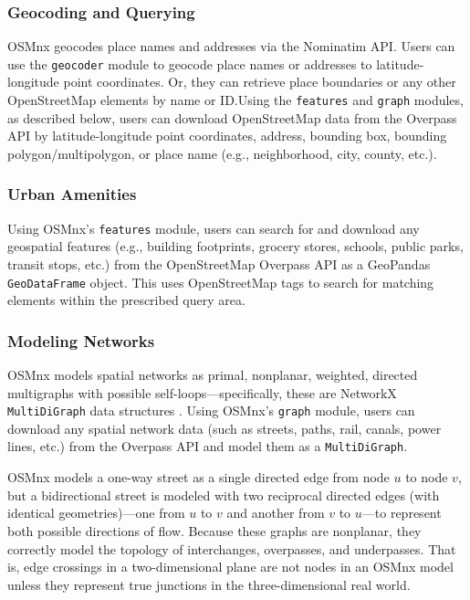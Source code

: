 \documentclass[12pt,letterpaper]{article} %
\begin{document}
\subsubsection{Geocoding and Querying}

OSMnx geocodes place names and addresses via the Nominatim API\@. Users can use the \texttt{geocoder} module to geocode place names or addresses to latitude-longitude point coordinates. Or, they can retrieve place boundaries or any other OpenStreetMap elements by name or ID.\@ Using the \texttt{features} and \texttt{graph} modules, as described below, users can download OpenStreetMap data from the Overpass API by latitude-longitude point coordinates, address, bounding box, bounding polygon/multipolygon, or place name (e.g., neighborhood, city, county, etc.).

\subsubsection{Urban Amenities}

Using OSMnx's \texttt{features} module, users can search for and download any geospatial features (e.g., building footprints, grocery stores, schools, public parks, transit stops, etc.) from the OpenStreetMap Overpass API as a GeoPandas \texttt{GeoDataFrame} object. This uses OpenStreetMap tags to search for matching elements within the prescribed query area.

\subsubsection{Modeling Networks}

OSMnx models spatial networks as primal, nonplanar, weighted, directed multigraphs with possible self-loops---specifically, these are NetworkX \texttt{MultiDiGraph} data structures \citep{hagberg_exploring_2008}. Using OSMnx's \texttt{graph} module, users can download any spatial network data (such as streets, paths, rail, canals, power lines, etc.) from the Overpass API and model them as a \texttt{MultiDiGraph}.

OSMnx models a one-way street as a single directed edge from node $u$ to node $v$, but a bidirectional street is modeled with two reciprocal directed edges (with identical geometries)---one from $u$ to $v$ and another from $v$ to $u$---to represent both possible directions of flow. Because these graphs are nonplanar, they correctly model the topology of interchanges, overpasses, and underpasses. That is, edge crossings in a two-dimensional plane are not nodes in an OSMnx model unless they represent true junctions in the three-dimensional real world.
\end{document}
